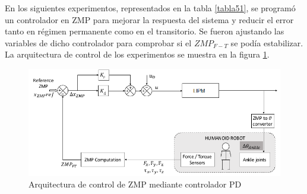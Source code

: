 En los siguientes experimentos, representados en la tabla \ref{tabla51}, se programó un controlador en ZMP para mejorar la respuesta del sistema y reducir el error tanto en régimen permanente como en el transitorio. Se fueron ajustando las variables de dicho controlador para comprobar si el $ZMP_{F-T}$ se podía estabilizar. La arquitectura de control de los experimentos se muestra en la figura \ref{figura56}.

\begin{figure}[H]
\centering
\includegraphics[scale=0.6]{imagenes/apartado_5/56_esquema_bucle_cerrado}
\caption{Arquitectura de control de ZMP mediante controlador PD}
\label{figura56}
\end{figure}


